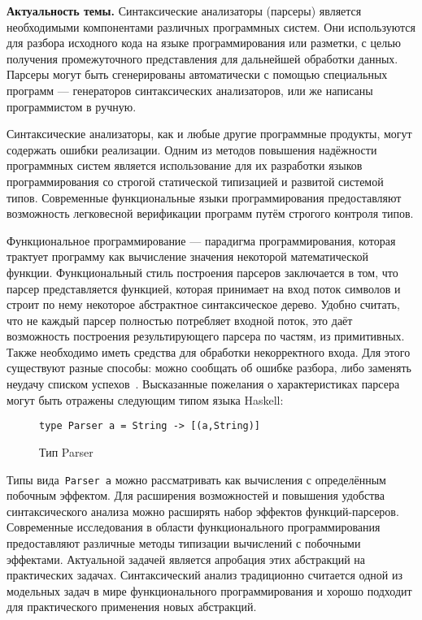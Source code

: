 \Intro

\textbf{Актуальность темы.} Синтаксические анализаторы (парсеры) является необходимыми
компонентами различных программных систем. Они используются для разбора исходного
кода на языке программирования или разметки, с целью получения промежуточного
представления для дальнейшей обработки данных. Парсеры могут быть сгенерированы
автоматически с помощью специальных программ --- генераторов синтаксических
анализаторов, или же написаны программистом в ручную.

Синтаксические анализаторы, как и любые другие программные продукты, могут
содержать ошибки реализации. Одним из методов повышения надёжности программных
систем является использование для их разработки языков программирования со
строгой статической типизацией и развитой системой типов. Современные функциональные
языки программирования предоставляют возможность легковесной верификации программ
путём строгого контроля типов.

Функциональное программирование --- парадигма программирования, которая трактует
программу как вычисление значения некоторой математической функции.
Функциональный стиль построения парсеров заключается в том, что парсер
представляется функцией, которая принимает на вход поток символов и строит
по нему некоторое абстрактное синтаксическое дерево. Удобно считать, что не каждый
парсер полностью потребляет входной поток, это даёт возможность
построения результирующего парсера по частям, из примитивных. Также необходимо
иметь средства для обработки некорректного входа. Для этого существуют разные
способы: можно сообщать об ошибке разбора, либо заменять неудачу списком
успехов~\cite{wadlerSuccess}. Высказанные пожелания о характеристиках
парсера могут быть отражены следующим типом языка Haskell:

\begin{figure}[h]
\begin{lstlisting}
type Parser a = String -> [(a,String)]
\end{lstlisting}
\caption{Тип Parser}
\end{figure}

Типы вида~\lstinline{Parser a} можно рассматривать как вычисления с определённым
побочным эффектом. Для расширения возможностей и повышения удобства синтаксического
анализа можно расширять набор эффектов функций-парсеров.
Современные исследования в области функционального программирования предоставляют
различные методы типизации вычислений с побочными эффектами.
Актуальной задачей является апробация этих абстракций на практических
задачах. Синтаксический анализ традиционно считается одной из модельных
задач в мире функционального программирования и хорошо подходит для практического
применения новых абстракций.

